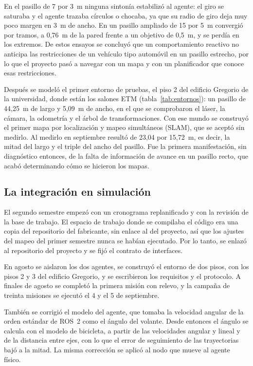 En el pasillo de 7 por 3~m ninguna sintonía estabilizó al agente: el giro se saturaba y el agente trazaba círculos o chocaba,
ya que su radio de giro deja muy poco margen en 3~m de ancho. En un pasillo ampliado de 15 por 5~m convergió por tramos, a
0,76~m de la pared frente a un objetivo de 0,5~m, y se perdía en los extremos. De estos ensayos se concluyó que un
comportamiento reactivo no anticipa las restricciones de un vehículo tipo automóvil en un pasillo estrecho, por lo que el
proyecto pasó a navegar con un mapa y con un planificador que conoce esas restricciones.

Después se modeló el primer entorno de pruebas, el piso 2 del edificio Gregorio de la universidad, donde están los salones ETM (tabla~\ref{tab:entornos}):
un pasillo de 44,25~m de largo y 5,09~m de ancho, en el que se comprobaron el láser, la cámara, la odometría y el árbol de
transformaciones. Con ese mundo se construyó el primer mapa por localización y mapeo simultáneos (SLAM), que se aceptó sin
medirlo. Al medirlo en septiembre resultó de 23,04 por 15,72~m, es decir, la mitad del largo y el triple del ancho del
pasillo. Fue la primera manifestación, sin diagnóstico entonces, de la falta de información de avance en un pasillo recto, que
acabó determinando cómo se hicieron los mapas.

\subsection{La integración en simulación}
\label{sec:recorrido-sim}

El segundo semestre empezó con un cronograma replanificado y con la revisión de la base de trabajo. El espacio de trabajo donde
se compilaba el código era una copia del repositorio del fabricante, sin enlace al del proyecto, así que los ajustes del mapeo
del primer semestre nunca se habían ejecutado. Por lo tanto, se enlazó al repositorio del proyecto y se fijó el contrato de
interfaces.

En agosto se aislaron los dos agentes, se construyó el entorno de dos pisos, con los pisos 2 y 3 del edificio Gregorio, y se
escribieron los requisitos y el protocolo. A finales de agosto se completó la primera misión con relevo, y la campaña de treinta
misiones se ejecutó el 4 y el 5 de septiembre.

También se corrigió el modelo del agente, que tomaba la velocidad angular de la orden estándar de ROS~2 como el ángulo del
volante. Desde entonces el ángulo se calcula con el modelo de bicicleta, a partir de las velocidades angular y lineal y de la
distancia entre ejes, con lo que el error de seguimiento de las trayectorias bajó a la mitad. La misma corrección se aplicó al
nodo que mueve al agente físico.


